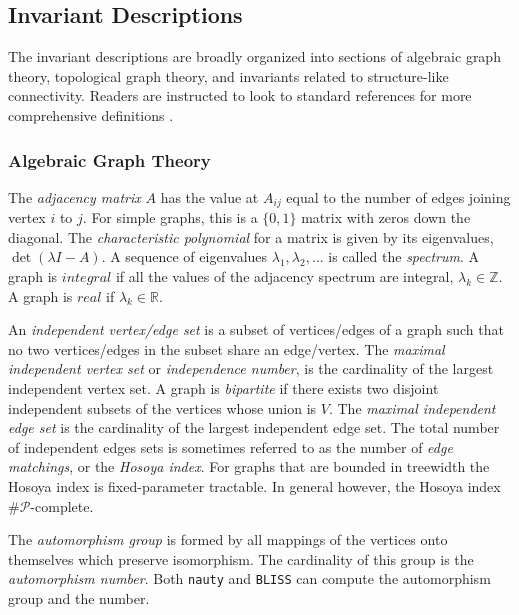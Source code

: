 \documentclass[12pt]{article}
\begin{document}



\begin{appendices}

\section{Invariant Descriptions}
\label{app:invariants}

The invariant descriptions are broadly organized into sections of algebraic graph theory, topological graph theory, and invariants related to structure-like connectivity.
Readers are instructed to look to standard references for more comprehensive definitions \cite{diestel2010graph, bondy2008graph, bollobas1998modern}.

\subsubsection*{Algebraic Graph Theory}

The \textit{adjacency matrix} $A$ has the value at $A_{ij}$ equal to the number of edges joining vertex $i$ to $j$. 
For simple graphs, this is a $\{0,1\}$ matrix with zeros down the diagonal. 
The \textit{characteristic polynomial} for a matrix is given by its eigenvalues, $\det(\lambda I - A)$.
A sequence of eigenvalues $\lambda_1, \lambda_2, \ldots$ is called the \textit{spectrum}.
A graph is $integral$ if all the values of the adjacency spectrum are integral, $\lambda_k \in \mathbb{Z}$. 
A graph is $real$ if $\lambda_k \in \mathbb{R}$.

An \textit{independent vertex/edge set} is a subset of vertices/edges of a graph such that no two vertices/edges in the subset share an edge/vertex. 
The \textit{maximal independent vertex set} or \textit{independence number}, is the cardinality of the largest independent vertex set.
A graph is \textit{bipartite} if there exists two disjoint independent subsets of the vertices whose union is $V$.
The \textit{maximal independent edge set} is the cardinality of the largest independent edge set.
The total number of independent edges sets is sometimes referred to as the number of \textit{edge matchings}, or the \textit{Hosoya index}\cite{hosoya1971topological}.
For graphs that are bounded in treewidth the Hosoya index is fixed-parameter tractable.
In general however, the Hosoya index $\mathcal{\#P}$-complete\cite{jerrum1987two}.

The \textit{automorphism group} is formed by all mappings of the vertices onto themselves which preserve isomorphism. 
The cardinality of this group is the \textit{automorphism number}.
Both \texttt{nauty} and \texttt{BLISS} \cite{junttila2007engineering,mckay2014practical} can compute the automorphism group and the number.


\end{appendices}
\end{document}
